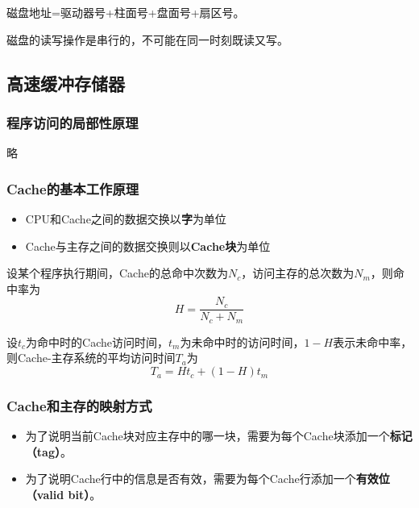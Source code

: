 \documentclass[12pt, a4paper, oneside]{ctexart}
\begin{document}
磁盘地址=驱动器号+柱面号+盘面号+扇区号。

磁盘的读写操作是串行的，不可能在同一时刻既读又写。

\subsection{高速缓冲存储器}

\subsubsection{程序访问的局部性原理}

略

\subsubsection{Cache的基本工作原理}

\begin{itemize}
  \item CPU和Cache之间的数据交换以\textbf{字}为单位
  \item Cache与主存之间的数据交换则以\textbf{Cache块}为单位
\end{itemize}

设某个程序执行期间，Cache的总命中次数为$N_c$，访问主存的总次数为$N_m$，则命中率为
\begin{equation*}
  H=\frac{N_c}{N_c+N_m}
\end{equation*}

设$t_c$为命中时的Cache访问时间，$t_m$为未命中时的访问时间，$1-H$表示未命中率，则Cache-主存系统的平均访问时间$T_a$为
\begin{equation*}
  T_a=Ht_c+(1-H)t_m
\end{equation*}

\subsubsection{Cache和主存的映射方式}

\begin{itemize}
  \item 为了说明当前Cache块对应主存中的哪一块，需要为每个Cache块添加一个\textbf{标记（tag）}。
  \item 为了说明Cache行中的信息是否有效，需要为每个Cache行添加一个\textbf{有效位（valid bit）}。
\end{itemize}
\end{document}
